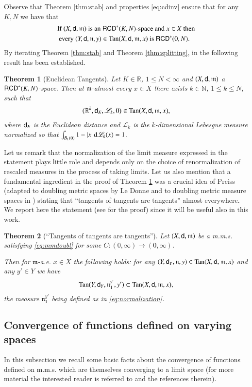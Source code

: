 \documentclass[11pt,reqno]{amsart}
\newcommand{\mm}{\mathfrak m}
\newcommand{\nn}{\mathfrak n}
\newcommand{\sfd}{{\sf d}}
\newcommand{\LL}{\mathscr{L}}
\renewcommand{\d}{{\rm{d}}}
\newcommand{\R}{\mathbb{R}}
\newcommand{\N}{\mathbb{N}}
\newcommand{\Tan}{{\rm Tan}}
\newcommand{\RCD}{{\sf RCD}}
\newtheorem{theorem}{Theorem}[section]
\theoremstyle{definition}
\theoremstyle{remark}
\theoremstyle{remark}
\theoremstyle{remark}
\theoremstyle{remark}
\theoremstyle{remark}
\theoremstyle{remark}
\theoremstyle{remark}
\begin{document}
Observe that Theorem \ref{thm:stab} and properties \eqref{eq:cdinv} ensure that for any $K,N$ we have that
\begin{equation}
\label{eq:tancd}
\begin{split}
&\text{If }(X,\sfd,\mm)\text{ is an  $\RCD^*(K,N)$-space and $x\in X$ then}\\
&\text{ every $(Y,\sfd,\nn,y)\in\Tan(X,\sfd,\mm,x)$ is  $\RCD^*(0,N)$.}
\end{split}
\end{equation}
By iterating Theorem \ref{thm:stab} and Theorem \ref{thm:splitting},  in \cite{GMR2013} the following result has been established.
\begin{theorem}[Euclidean Tangents]\label{thm:euclideantangents}
 Let $K \in \R$, $1 \le N < \infty$ and  $(X,\sfd,\mm)$  a $\RCD^*(K,N)$-space.
 Then at $\mm$-almost every $x \in X$ there exists $k \in \N$, $1\le k \le N$, such that 
 $$
  (\R^k,\sfd_{E},\LL_k,0) \in \Tan(X,\sfd,\mm,x),  
 $$
 where $\sfd_{E}$ is the Euclidean distance and $\LL_k$ is the $k$-dimensional
 Lebesgue measure normalized so that $\int_{B_1(0)}1-|x|\,\d\LL_k(x)=1$.
\end{theorem}
Let us remark that the normalization of the limit measure expressed in the statement plays little role  and depends only on the choice of renormalization of rescaled measures in the process of taking limits. Let us also mention  that a fundamental ingredient in the proof of Theorem \ref{thm:euclideantangents} was a crucial idea of Preiss \cite{P1987} (adapted to doubling metric spaces by Le Donne \cite{LD2011} and to doubling metric measure spaces in \cite{GMR2013})
stating that  ``tangents of tangents are tangents'' almost everywhere. We report here the statement (see \cite[Theorem 3.2]{GMR2013} for the proof) since it will be useful also in this work.
\begin{theorem}[``Tangents of tangents are tangents'']\label{thm:iteratedtangents}
Let  $(X,\sfd,\mm)$ be a m.m.s. satisfying \eqref{eq:mmdoubl} for some $C:(0,\infty)\to(0,\infty)$.

Then for  $\mm$-a.e.  $x \in X$ the following holds:  for any $(Y,\sfd_Y,\nn,y) \in \Tan(X,\sfd,\mm,x)$ and any $y' \in Y$ we have
 \[
  \Tan(Y,\sfd_Y,\nn^{y'}_1,y') \subset \Tan(X,\sfd,\mm,x),
 \]
 the measure $\nn^{y'}_1$ being defined as in \eqref{eq:normalization}.
\end{theorem}

\subsection{Convergence of functions defined on varying spaces}\label{SubSec:ConvFunct} 
In this subsection we recall some basic facts about the convergence of functions defined on m.m.s.  which are themselves converging to a limit space (for more material the interested reader is referred to \cite{GMS2013} and the references therein).  
\end{document}
